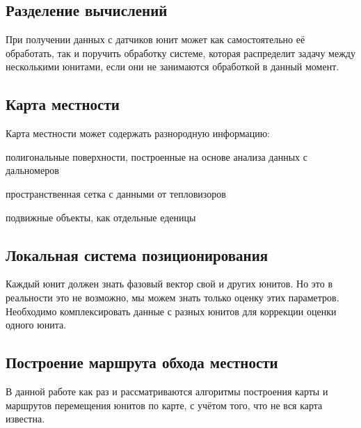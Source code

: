 \subsection{Разделение вычислений}

При получении данных с датчиков юнит может как самостоятельно
её обработать, так и поручить обработку системе, которая
распределит задачу между несколькими юнитами, если они не
занимаются обработкой в данный момент.

\subsection{Карта местности}

Карта местности может содержать разнородную информацию:
\begin{mintemize}
    \item полигональные поверхности, построенные на основе анализа
        данных с дальномеров
    \item пространственная сетка с данными от тепловизоров
    \item подвижные объекты, как отдельные еденицы
\end{mintemize}

\subsection{Локальная система позиционирования}

Каждый юнит должен знать фазовый вектор свой и других юнитов.
Но это в реальности это не возможно, мы можем знать только
оценку этих параметров. Необходимо комплексировать данные с разных
юнитов для коррекции оценки одного юнита.

\subsection{Построение маршрута обхода местности}

В данной работе как раз и рассматриваются алгоритмы построения
карты и маршрутов перемещения юнитов по карте, с учётом того,
что не вся карта известна.
